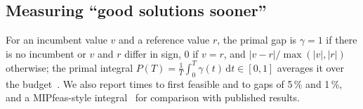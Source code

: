 \subsection{Measuring ``good solutions sooner''}
For an incumbent value $v$ and a reference value $r$, the primal gap is $\gamma = 1$ if there is no incumbent or $v$
and $r$ differ in sign, $0$ if $v = r$, and $|v-r|/\max(|v|,|r|)$ otherwise; the primal integral
$P(T) = \frac{1}{T}\int_0^T \gamma(t)\,\mathrm{d}t \in [0,1]$ averages it over the budget~\citep{berthold2013primal}.
We also report times to first feasible and to gaps of 5\,\% and 1\,\%, and a MIPfeas-style
integral~\citep{bussieck2026mipfeas,mittelmann2026mipfeas} for comparison with published results.
